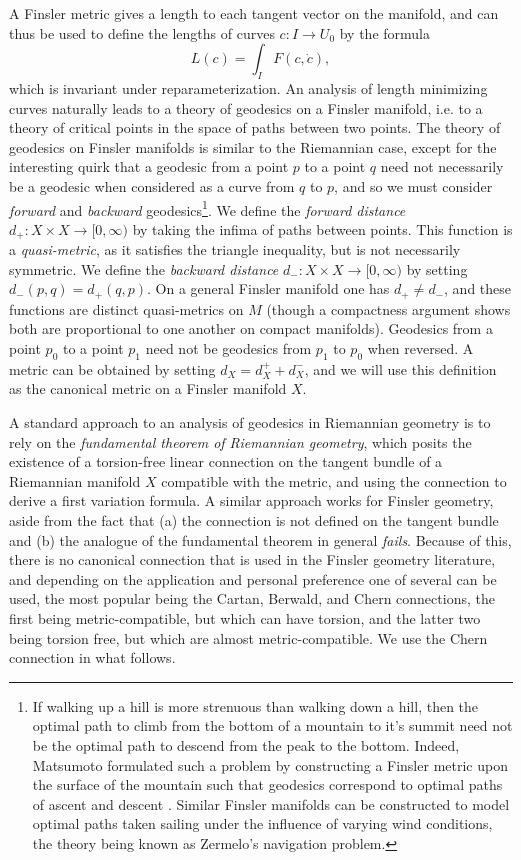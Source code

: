 A Finsler metric gives a length to each tangent vector on the manifold, and can thus be used to define the lengths of curves $c: I \to U_0$ by the formula
%
\begin{equation}
  L(c) = \int_I F(c,\dot{c}),
\end{equation}
%
which is invariant under reparameterization. An analysis of length minimizing curves naturally leads to a theory of geodesics on a Finsler manifold, i.e. to a theory of critical points in the space of paths between two points. The theory of geodesics on Finsler manifolds is similar to the Riemannian case, except for the interesting quirk that a geodesic from a point $p$ to a point $q$ need not necessarily be a geodesic when considered as a curve from $q$ to $p$, and so we must consider \emph{forward} and \emph{backward} geodesics\footnote{If walking up a hill is more strenuous than walking down a hill, then the optimal path to climb from the bottom of a mountain to it's summit need not be the optimal path to descend from the peak to the bottom. Indeed, Matsumoto formulated such a problem by constructing a Finsler metric upon the surface of the mountain such that geodesics correspond to optimal paths of ascent and descent \cite{Matsumoto}. Similar Finsler manifolds can be constructed to model optimal paths taken sailing under the influence of varying wind conditions, the theory being known as Zermelo's navigation problem.}. We define the \emph{forward distance} $d_+: X \times X \to [0,\infty)$ by taking the infima of paths between points. This function is a \emph{quasi-metric}, as it satisfies the triangle inequality, but is not necessarily symmetric. We define the \emph{backward distance} $d_-: X \times X \to [0,\infty)$ by setting $d_-(p,q) = d_+(q,p)$. On a general Finsler manifold one has $d_+ \neq d_-$, and these functions are distinct quasi-metrics on $M$ (though a compactness argument shows both are proportional to one another on compact manifolds). Geodesics from a point $p_0$ to a point $p_1$ need not be geodesics from $p_1$ to $p_0$ when reversed. A metric can be obtained by setting $d_X = d_X^+ + d_X^-$, and we will use this definition as the canonical metric on a Finsler manifold $X$.

A standard approach to an analysis of geodesics in Riemannian geometry is to rely on the \emph{fundamental theorem of Riemannian geometry}, which posits the existence of a torsion-free linear connection on the tangent bundle of a Riemannian manifold $X$ compatible with the metric, and using the connection to derive a first variation formula. A similar approach works for Finsler geometry, aside from the fact that (a) the connection is not defined on the tangent bundle and (b) the analogue of the fundamental theorem in general \emph{fails}. Because of this, there is no canonical connection that is used in the Finsler geometry literature, and depending on the application and personal preference one of several can be used, the most popular being the Cartan, Berwald, and Chern connections, the first being metric-compatible, but which can have torsion, and the latter two being torsion free, but which are almost metric-compatible. We use the Chern connection in what follows.

